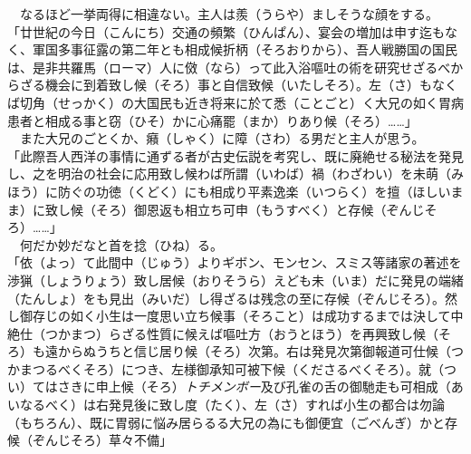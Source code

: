 　なるほど一挙両得に相違ない。主人は羨（うらや）ましそうな顔をする。\\

「廿世紀の今日（こんにち）交通の頻繁（ひんぱん）、宴会の増加は申す迄もなく、軍国多事征露の第二年とも相成候折柄（そろおりから）、吾人戦勝国の国民は、是非共羅馬（ローマ）人に傚（なら）って此入浴嘔吐の術を研究せざるべからざる機会に到着致し候（そろ）事と自信致候（いたしそろ）。左（さ）もなくば切角（せっかく）の大国民も近き将来に於て悉（ことごと）く大兄の如く胃病患者と相成る事と窃（ひそ）かに心痛罷（まか）りあり候（そろ）\ldots{}\ldots{}」\\

　また大兄のごとくか、癪（しゃく）に障（さわ）る男だと主人が思う。\\

「此際吾人西洋の事情に通ずる者が古史伝説を考究し、既に廃絶せる秘法を発見し、之を明治の社会に応用致し候わば所謂（いわば）禍（わざわい）を未萌（みほう）に防ぐの功徳（くどく）にも相成り平素逸楽（いつらく）を擅（ほしいまま）に致し候（そろ）御恩返も相立ち可申（もうすべく）と存候（ぞんじそろ）\ldots{}\ldots{}」\\

　何だか妙だなと首を捻（ひね）る。\\

「依（よっ）て此間中（じゅう）よりギボン、モンセン、スミス等諸家の著述を渉猟（しょうりょう）致し居候（おりそうら）えども未（いま）だに発見の端緒（たんしょ）をも見出（みいだ）し得ざるは残念の至に存候（ぞんじそろ）。然し御存じの如く小生は一度思い立ち候事（そろこと）は成功するまでは決して中絶仕（つかまつ）らざる性質に候えば嘔吐方（おうとほう）を再興致し候（そろ）も遠からぬうちと信じ居り候（そろ）次第。右は発見次第御報道可仕候（つかまつるべくそろ）につき、左様御承知可被下候（くださるべくそろ）。就（つい）てはさきに申上候（そろ）\emph{トチメンボー}及び孔雀の舌の御馳走も可相成（あいなるべく）は右発見後に致し度（たく）、左（さ）すれば小生の都合は勿論（もちろん）、既に胃弱に悩み居らるる大兄の為にも御便宜（ごべんぎ）かと存候（ぞんじそろ）草々不備」\\

